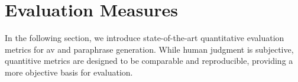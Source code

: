 \section{Evaluation Measures}
\label{sec:evaluation_measures}

In the following section, we introduce state-of-the-art quantitative evaluation metrics for \ac{av} and paraphrase generation. 
While human judgment is subjective, quantitive metrics are designed to be comparable and reproducible, providing a more objective basis for evaluation.






